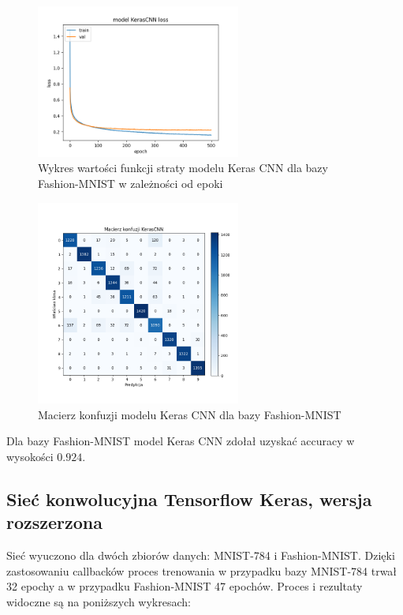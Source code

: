 \documentclass{article}
\begin{document}
\begin{figure}[H]
    \centering
    \includegraphics[width=0.6\textwidth]{../Saves/KerasCNN/fashion-mnist/KerasCNN_fashion-mnist_ep500_loss.png}
    \caption{Wykres wartości funkcji straty modelu Keras CNN dla bazy Fashion-MNIST w zależności od epoki}
\end{figure}

\begin{figure}[H]
	\centering
	\includegraphics[width=0.6\textwidth]{../Saves/KerasCNN/fashion-mnist/KerasCNN_fashion-mnist_conf_mat.png}
	\caption{Macierz konfuzji modelu Keras CNN dla bazy Fashion-MNIST}
\end{figure}
Dla bazy Fashion-MNIST model Keras CNN zdołał uzyskać accuracy w wysokości $0.924$.


\subsection{Sieć konwolucyjna Tensorflow Keras, wersja rozszerzona}
Sieć wyuczono dla dwóch zbiorów danych: MNIST-784 i Fashion-MNIST. Dzięki zastosowaniu callbacków proces trenowania w przypadku bazy MNIST-784 trwał 32 epochy a w przypadku Fashion-MNIST 47 epochów. Proces i rezultaty widoczne są na poniższych wykresach:
\end{document}
